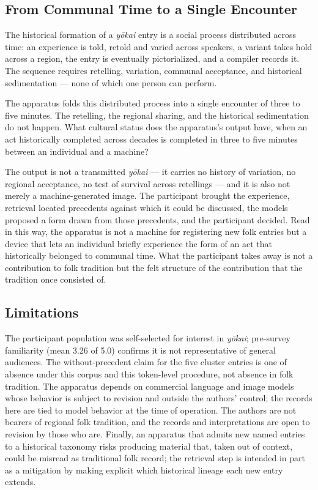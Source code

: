 \documentclass[manuscript,review,anonymous,nonacm]{acmart}
\begin{document}
\subsection{From Communal Time to a Single Encounter}

The historical formation of a \textit{y\=okai} entry is a social process distributed across time: an experience is told, retold and varied across speakers, a variant takes hold across a region, the entry is eventually pictorialized, and a compiler records it. The sequence requires retelling, variation, communal acceptance, and historical sedimentation — none of which one person can perform.

The apparatus folds this distributed process into a single encounter of three to five minutes. The retelling, the regional sharing, and the historical sedimentation do not happen. What cultural status does the apparatus's output have, when an act historically completed across decades is completed in three to five minutes between an individual and a machine?

The output is not a transmitted \textit{y\=okai} — it carries no history of variation, no regional acceptance, no test of survival across retellings — and it is also not merely a machine-generated image. The participant brought the experience, retrieval located precedents against which it could be discussed, the models proposed a form drawn from those precedents, and the participant decided. Read in this way, the apparatus is not a machine for registering new folk entries but a device that lets an individual briefly experience the form of an act that historically belonged to communal time. What the participant takes away is not a contribution to folk tradition but the felt structure of the contribution that the tradition once consisted of.

\subsection{Limitations}

The participant population was self-selected for interest in \textit{y\=okai}; pre-survey familiarity (mean 3.26 of 5.0) confirms it is not representative of general audiences. The without-precedent claim for the five cluster entries is one of absence under this corpus and this token-level procedure, not absence in folk tradition. The apparatus depends on commercial language and image models whose behavior is subject to revision and outside the authors' control; the records here are tied to model behavior at the time of operation. The authors are not bearers of regional folk tradition, and the records and interpretations are open to revision by those who are. Finally, an apparatus that admits new named entries to a historical taxonomy risks producing material that, taken out of context, could be misread as traditional folk record; the retrieval step is intended in part as a mitigation by making explicit which historical lineage each new entry extends.
\end{document}
